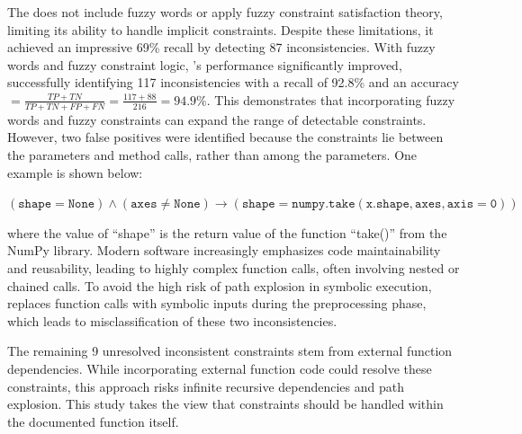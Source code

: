The \vanillatool does not include fuzzy words or apply fuzzy constraint satisfaction theory, limiting its ability to handle implicit constraints. Despite these limitations, it achieved an impressive 69\% recall by detecting 87 inconsistencies. With fuzzy words and fuzzy constraint logic, \toolchecker's performance significantly improved, successfully identifying 117 inconsistencies with a recall of 92.8\% and  an accuracy $=\frac{TP+TN}{TP+TN+FP+FN}=\frac{117+88}{216}=94.9\%$. This demonstrates that incorporating fuzzy words and fuzzy constraints can expand the range of detectable constraints. However, two false positives were identified because the constraints lie between the parameters and method calls, rather than among the parameters. One example is shown below:


\(
(\mathtt{shape}=\mathtt{None}) \land
(\mathtt{axes}\neq\mathtt{None}) \rightarrow
(\mathtt{shape}=\mathtt{numpy.take(x.shape,axes,axis=0)})
\)


where the value of ``shape'' is the return value of the function ``take()'' from the NumPy library. Modern software increasingly emphasizes code maintainability and reusability, leading to highly complex function calls, often involving nested or chained calls. To avoid the high risk of path explosion in symbolic execution, \toolchecker replaces function calls with symbolic inputs during the preprocessing phase, which leads to misclassification of these two inconsistencies.



The remaining 9 unresolved inconsistent constraints stem from external function dependencies. While incorporating external function code could resolve these constraints, this approach risks infinite recursive dependencies and path explosion. This study takes the view that constraints should be handled within the documented function itself.




